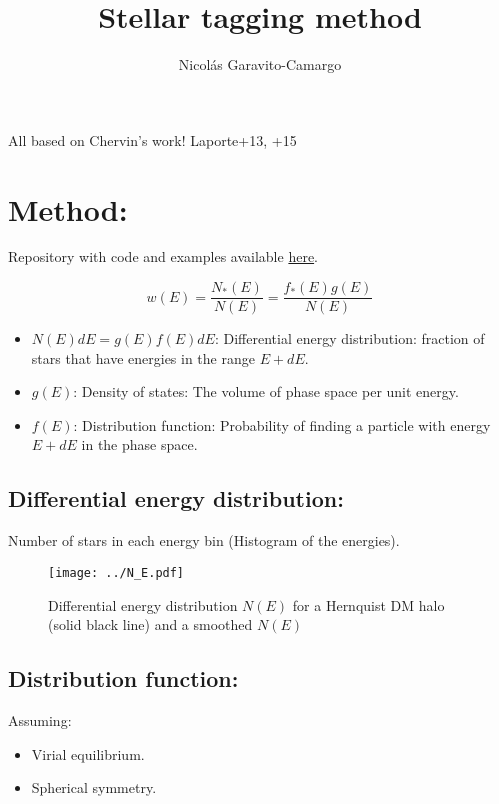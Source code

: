 \documentclass[14pt]{article}
\title{Stellar tagging method}
\author{Nicol\'as Garavito-Camargo}
\begin{document}
\maketitle

All based on Chervin's work! Laporte+13, +15\\

\section{Method:}


Repository with code and examples available
\href{https://github.com/jngaravitoc/tracers_triaxial/tree/interpolation}{here}.

\begin{equation}
  w(E) = \dfrac{N_*(E)}{N(E)} = \dfrac{f_*(E)g(E)}{N(E)}
\end{equation}

\begin{itemize}
  \item $N(E)dE = g(E)f(E)dE$: Differential energy distribution: fraction of stars
    that have energies in the range $E+dE$.
  \item $g(E)$: Density of states: The volume of phase space per unit energy.
  \item $f(E)$: Distribution function: Probability of finding a particle with
    energy $E+dE$ in the phase space. 
\end{itemize}

\subsection{Differential energy distribution:}

Number of stars in each energy bin (Histogram of the energies).

\begin{figure}[H]
  \centering
  \texttt{[image: ../N\_E.pdf]}
  \caption{Differential energy distribution  $N(E)$ for a Hernquist DM halo (solid black
  line) and a smoothed $N(E)$}
\end{figure}


\subsection{Distribution function:}


Assuming:

\begin{itemize}
  \item Virial equilibrium.
  \item Spherical symmetry.  
\end{itemize}
\end{document}
